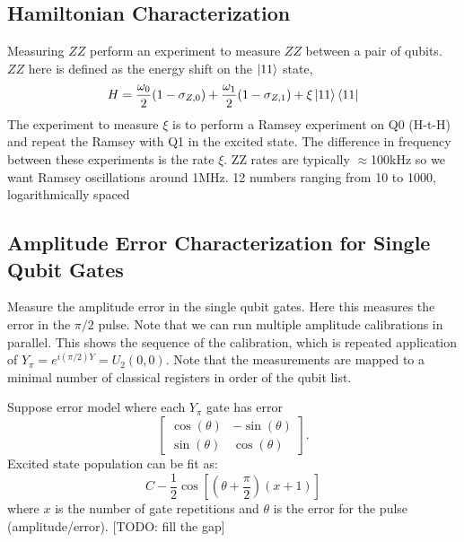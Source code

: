 \documentclass[11pt, oneside]{article}   	%
\begin{document}
\subsection{Hamiltonian Characterization}
Measuring $ZZ$
perform an experiment to measure $ZZ$ between a pair of qubits. 
$ZZ$ here is defined as the energy shift on the $\ket{11}$ state,
\begin{equation}
H = \frac{\omega_0}{2} (1 - \sigma_{Z, 0}) + \frac{\omega_1}{2} (1 - \sigma_{Z, 1}) + \xi \ket{11} \bra{11}
\end{equation}
The experiment to measure $\xi$ is to perform a Ramsey experiment on Q0 (H-t-H) and repeat the Ramsey with Q1 in the excited state. 
The difference in frequency between these experiments is the rate $\xi$. 
ZZ rates are typically $\approx$100kHz so we want Ramsey oscillations around 1MHz.
12 numbers ranging from 10 to 1000, logarithmically spaced

\subsection{Amplitude Error Characterization for Single Qubit Gates}
Measure the amplitude error in the single qubit gates. 
Here this measures the error in the $\pi/2$ pulse. 
Note that we can run multiple amplitude calibrations in parallel. 
This shows the sequence of the calibration, which is repeated application of $Y_{\pi} = e^{i (\pi/2) Y} = U_2(0, 0)$. 
Note that the measurements are mapped to a minimal number of classical registers in order of the qubit list.

Suppose error model where each $Y_{\pi}$ gate has error
\begin{equation}
\begin{bmatrix}
\cos (\theta) & - \sin (\theta) \\
\sin (\theta) & \cos (\theta)
\end{bmatrix}.
\end{equation}
Excited state population can be fit as:
\begin{equation}
C - \frac{1}{2} \cos \left[ \left( \theta + \frac{\pi}{2} \right) (x + 1) \right]
\end{equation}
where $x$ is the number of gate repetitions and $\theta$ is the error for the pulse (amplitude/error). [TODO: fill the gap]
\end{document}

